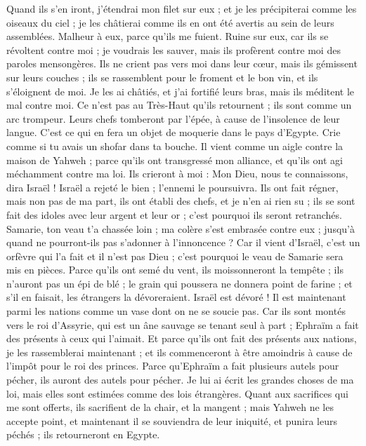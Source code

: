 \begin{multicols}{2}
Quand ils s'en iront, j'étendrai mon filet sur eux ; et je les précipiterai comme les oiseaux du ciel ; je les châtierai comme ils en ont été avertis au sein de leurs assemblées.
Malheur à eux, parce qu'ils me fuient. Ruine sur eux, car ils se révoltent contre moi ; je voudrais les sauver, mais ils profèrent contre moi des paroles mensongères.
Ils ne crient pas vers moi dans leur cœur, mais ils gémissent sur leurs couches ; ils se rassemblent pour le froment et le bon vin, et ils s'éloignent de moi.
Je les ai châtiés, et j'ai fortifié leurs bras, mais ils méditent le mal contre moi.
Ce n'est pas au Très-Haut qu'ils retournent ; ils sont comme un arc trompeur. Leurs chefs tomberont par l'épée, à cause de l'insolence de leur langue. C'est ce qui en fera un objet de moquerie dans le pays d'Egypte.
\VerseOne{}Crie comme si tu avais un shofar dans ta bouche. Il vient comme un aigle contre la maison de Yahweh ; parce qu'ils ont transgressé mon alliance, et qu'ils ont agi méchamment contre ma loi.
Ils crieront à moi : Mon Dieu, nous te connaissons, dira Israël !
Israël a rejeté le bien ; l'ennemi le poursuivra.
Ils ont fait régner, mais non pas de ma part, ils ont établi des chefs, et je n'en ai rien su ; ils se sont fait des idoles avec leur argent et leur or ; c'est pourquoi ils seront retranchés.
Samarie, ton veau t'a chassée loin ; ma colère s'est embrasée contre eux ; jusqu'à quand ne pourront-ils pas s'adonner à l'innoncence ?
Car il vient d'Israël, c'est un orfèvre qui l'a fait et il n'est pas Dieu ; c'est pourquoi le veau de Samarie sera mis en pièces.
Parce qu'ils ont semé du vent, ils moissonneront la tempête ; ils n'auront pas un épi de blé ; le grain qui poussera ne donnera point de farine ; et s'il en faisait, les étrangers la dévoreraient.
Israël est dévoré ! Il est maintenant parmi les nations comme un vase dont on ne se soucie pas.
Car ils sont montés vers le roi d'Assyrie, qui est un âne sauvage se tenant seul à part ; Ephraïm a fait des présents à ceux qui l'aimait.
Et parce qu'ils ont fait des présents aux nations, je les rassemblerai maintenant ; et ils commenceront à être amoindris à cause de l'impôt pour le roi des princes.
Parce qu'Ephraïm a fait plusieurs autels pour pécher, ils auront des autels pour pécher.
Je lui ai écrit les grandes choses de ma loi, mais elles sont estimées comme des lois étrangères.
Quant aux sacrifices qui me sont offerts, ils sacrifient de la chair, et la mangent ; mais Yahweh ne les accepte point, et maintenant il se souviendra de leur iniquité, et punira leurs péchés ; ils retourneront en Egypte.

\end{multicols}
